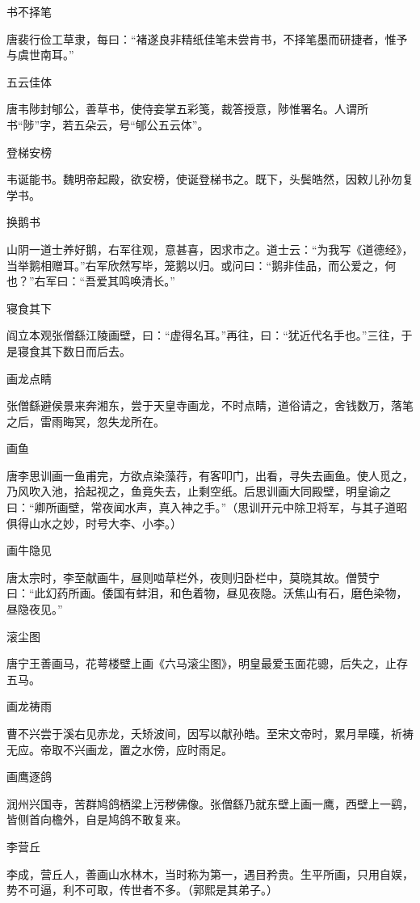 \documentclass[a4paper,12pt,UTF8,twoside]{ctexbook}
\begin{document}
    书不择笔
    
    唐裴行俭工草隶，每曰：“褚遂良非精纸佳笔未尝肯书，不择笔墨而研捷者，惟予与虞世南耳。”
    
    五云佳体
    
    唐韦陟封郇公，善草书，使侍妾掌五彩笺，裁答授意，陟惟署名。人谓所书“陟”字，若五朵云，号“郇公五云体”。
    
    登梯安榜
    
    韦诞能书。魏明帝起殿，欲安榜，使诞登梯书之。既下，头鬓皓然，因敕儿孙勿复学书。
    
    换鹅书
    
    山阴一道士养好鹅，右军往观，意甚喜，因求市之。道士云：“为我写《道德经》，当举鹅相赠耳。”右军欣然写毕，笼鹅以归。或问曰：“鹅非佳品，而公爱之，何也？”右军曰：“吾爱其鸣唤清长。”
    
    寝食其下
    
    阎立本观张僧繇江陵画壁，曰：“虚得名耳。”再往，曰：“犹近代名手也。”三往，于是寝食其下数日而后去。
    
    画龙点睛
    
    张僧繇避侯景来奔湘东，尝于天皇寺画龙，不时点睛，道俗请之，舍钱数万，落笔之后，雷雨晦冥，忽失龙所在。
    
    画鱼
    
    唐李思训画一鱼甫完，方欲点染藻荇，有客叩门，出看，寻失去画鱼。使人觅之，乃风吹入池，拾起视之，鱼竟失去，止剩空纸。后思训画大同殿壁，明皇谕之曰：“卿所画壁，常夜闻水声，真入神之手。”（思训开元中除卫将军，与其子道昭俱得山水之妙，时号大李、小李。）
    
    画牛隐见
    
    唐太宗时，李至献画牛，昼则啮草栏外，夜则归卧栏中，莫晓其故。僧赞宁曰：“此幻药所画。倭国有蚌泪，和色着物，昼见夜隐。沃焦山有石，磨色染物，昼隐夜见。”
    
    滚尘图
    
    唐宁王善画马，花萼楼壁上画《六马滚尘图》，明皇最爱玉面花骢，后失之，止存五马。
    
    画龙祷雨
    
    曹不兴尝于溪右见赤龙，夭矫波间，因写以献孙皓。至宋文帝时，累月旱暵，祈祷无应。帝取不兴画龙，置之水傍，应时雨足。
    
    画鹰逐鸽
    
    润州兴国寺，苦群鸠鸽栖梁上污秽佛像。张僧繇乃就东壁上画一鹰，西壁上一鹞，皆侧首向檐外，自是鸠鸽不敢复来。
    
    李营丘
    
    李成，营丘人，善画山水林木，当时称为第一，遇目矜贵。生平所画，只用自娱，势不可逼，利不可取，传世者不多。（郭熙是其弟子。）
    
\end{document}
